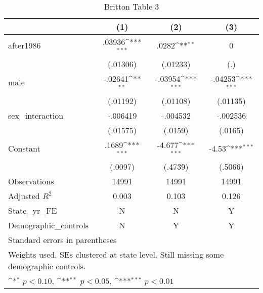 \begin{table}[htbp]\centering
\def\sym#1{\ifmmode^{#1}\else\(^{#1}\)\fi}
\caption{Britton Table 3}
\begin{tabular}{l*{3}{c}}
\hline\hline
                    &\multicolumn{1}{c}{(1)}         &\multicolumn{1}{c}{(2)}         &\multicolumn{1}{c}{(3)}         \\
\hline
after1986           &      .03936\sym{***}&       .0282\sym{**} &           0         \\
                    &    (.01306)         &    (.01233)         &         (.)         \\
[1em]
male                &     -.02641\sym{**} &     -.03954\sym{***}&     -.04253\sym{***}\\
                    &    (.01192)         &    (.01108)         &    (.01135)         \\
[1em]
sex\_interaction     &    -.006419         &    -.004532         &    -.002536         \\
                    &    (.01575)         &     (.0159)         &     (.0165)         \\
[1em]
Constant            &       .1689\sym{***}&      -4.677\sym{***}&       -4.53\sym{***}\\
                    &     (.0097)         &     (.4739)         &     (.5066)         \\
\hline
Observations        &       14991         &       14991         &       14991         \\
Adjusted \(R^{2}\)  &       0.003         &       0.103         &       0.126         \\
State\_yr\_FE         &           N         &           N         &           Y         \\
Demographic\_controls&           N         &           Y         &           Y         \\
\hline\hline
\multicolumn{4}{l}{\footnotesize Standard errors in parentheses}\\
\multicolumn{4}{l}{\footnotesize Weights used. SEs clustered at state level. Still missing some demographic controls.}\\
\multicolumn{4}{l}{\footnotesize \sym{*} \(p<0.10\), \sym{**} \(p<0.05\), \sym{***} \(p<0.01\)}\\
\end{tabular}
\end{table}
